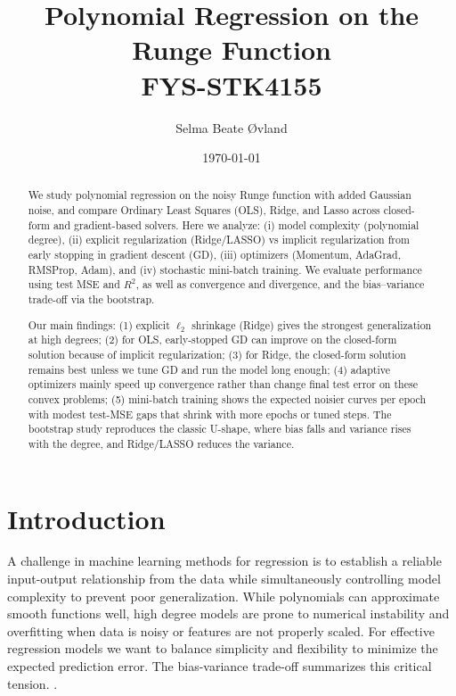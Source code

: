 \documentclass[amssymb,twocolumn,aps,floatfix]{revtex4-2}
\begin{document}
	
\title{Polynomial Regression on the Runge Function \\
    \normalsize FYS-STK4155}
\date{\today}               
\author{Selma Beate Øvland}

\newpage
	
\begin{abstract}

We study polynomial regression on the noisy Runge function with added Gaussian noise, and compare Ordinary Least Squares (OLS), Ridge, and Lasso across closed-form and gradient-based solvers. Here we analyze: (i) model complexity (polynomial degree), (ii) explicit regularization (Ridge/LASSO) vs implicit regularization from early stopping in gradient descent (GD), (iii) optimizers (Momentum, AdaGrad, RMSProp, Adam), and (iv) stochastic mini-batch training. We evaluate performance using test MSE and $R^2$, as well as convergence and divergence, and the bias–variance trade-off via the bootstrap. 

Our main findings: (1) explicit $\ell_2$ shrinkage (Ridge) gives the strongest generalization at high degrees; (2) for OLS, early-stopped GD can improve on the closed-form solution because of implicit regularization; (3) for Ridge, the closed-form solution remains best unless we tune GD and run the model long enough; (4) adaptive optimizers mainly speed up convergence rather than change final test error on these convex problems; (5) mini-batch training shows the expected noisier curves per epoch with modest test-MSE gaps that shrink with more epochs or tuned steps. The bootstrap study reproduces the classic U-shape, where bias falls and variance rises with the degree, and Ridge/LASSO reduces the variance.

\end{abstract}


\maketitle

\section{Introduction}
A challenge in machine learning methods for regression is to establish a reliable input-output relationship from the data while simultaneously controlling model complexity to prevent poor generalization. While polynomials can approximate smooth functions well, high degree models are prone to numerical instability and overfitting when data is noisy or features are not properly scaled. For effective regression models we want to balance simplicity and flexibility to minimize the expected prediction error. The bias-variance trade-off summarizes this critical tension. \cite{compfys39}. \\
\end{document}
